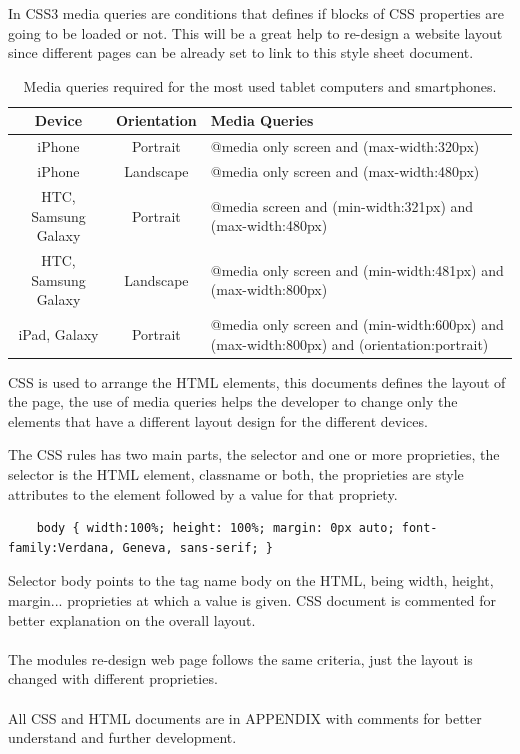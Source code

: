 In CSS3 media queries are conditions that defines if blocks of CSS properties are going to be loaded or not. This will be a great help to re-design a website layout since different pages can be already set to link to this style sheet document. \\
\begin{table}[!h]
	\begin{tabular}{| c | c | p{10.5cm} |}
	\hline
	\textbf{Device} & \textbf{Orientation} & \textbf{Media Queries} \\ \hline
	iPhone & Portrait & @media only screen and (max-width:320px)\\ \hline
	iPhone & Landscape & @media only screen and (max-width:480px)\\ \hline
	HTC, Samsung Galaxy & Portrait & @media screen and (min-width:321px) and (max-width:480px)\\ \hline
	HTC, Samsung Galaxy & Landscape & @media only screen and (min-width:481px) and (max-width:800px)\\ \hline
	iPad, Galaxy & Portrait & @media only screen and (min-width:600px) and (max-width:800px) and (orientation:portrait)\\ \hline
	\end{tabular}
	\caption{Media queries required for the most used tablet computers and smartphones.}
\end{table}

CSS is used to arrange the HTML elements, this documents defines the layout of the page, the use of media queries helps the developer to change only the elements that have a different layout design for the different devices.

The CSS rules has two main parts, the selector and one or more proprieties, the selector is the HTML element, classname or both, the proprieties are style attributes to the element followed by a value for that propriety.

\begin{lstlisting}
	body { width:100%; height: 100%; margin: 0px auto; font-family:Verdana, Geneva, sans-serif; }
\end{lstlisting}

Selector body points to the tag name body on the HTML, being width, height, margin... proprieties at which a value is given.
CSS document is commented for better explanation on the overall layout. 
\\
\\The modules re-design web page follows the same criteria, just the layout is changed with different proprieties.
\\
\\All CSS and HTML documents are in APPENDIX with comments for better understand and further development.
